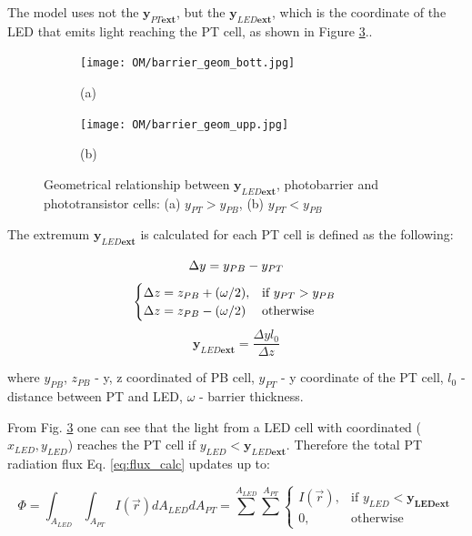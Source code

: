 The model uses not the $\boldsymbol{y_{\textit{PT}ext}}$, but the $\boldsymbol{y_{\textit{LED}ext}}$, 
which is the coordinate of the LED that emits light reaching the PT cell, as shown in Figure \ref{fig:extremum_ys_cell}..
\begin{figure}[H]
  \centering
  \begin{subfigure}[b]{0.3\textwidth}
    \texttt{[image: OM/barrier\_geom\_bott.jpg]}
    \centering
    \label{fig:extremum_ys_cell_bottom}
    \caption*{(a)}
  \end{subfigure}
  \begin{subfigure}[b]{0.35\textwidth}
    \texttt{[image: OM/barrier\_geom\_upp.jpg]}
    \label{fig:extremum_ys_cell_upp}
    \caption*{(b)}
  \end{subfigure}
  \caption{Geometrical relationship between $\boldsymbol{y_{\textit{LED}ext}}$, photobarrier and phototransistor cells: (a) $y_{PT} > y_{PB}$, (b)  $y_{PT} < y_{PB}$ }
  \label{fig:extremum_ys_cell}

\end{figure}

The extremum $\boldsymbol{y_{\textit{LED}ext}}$ is calculated for each PT cell is defined as the following:

$$
  \Delta y = y_{PB} - y_{PT}\\
$$
$$
  \begin{cases}
    \Delta z = z_{PB} + (\omega / 2), &  \text{if }y_{PT} > y_{PB}\\
    \Delta z = z_{PB} - (\omega / 2)  & \text{otherwise}
  \end{cases}\\
$$
$$
  \boldsymbol{y_{\textit{LED}ext}} = \frac{\Delta y  l_0}{\Delta z}
$$

where $y_{PB}$, $z_{PB}$ - y, z coordinated of PB cell, 
$y_{PT}$ - y coordinate of the PT cell,
$l_0$ - distance between PT and LED,
$\omega$ - barrier thickness.

From Fig. \ref{fig:extremum_ys_cell} one can see that the light from a LED cell with coordinated ($ x_{LED}, y_{LED}$) reaches the PT cell if $y_{LED} < \boldsymbol{y_{\textit{LED}ext}}$.
Therefore the total PT radiation flux Eq. \ref{eq:flux_calc} updates up to:

\begin{equation}
  \Phi = \int_{A_{LED}} \int_{A_{PT}} I(\vec{r})d A_{LED} d A_{PT} = \sum_{}^{A_{LED}} \sum_{}^{A_{PT}} \begin{cases}
    I(\vec{r}), & \text{if }y_{LED} < \boldsymbol{y_{\text{LED}ext}}\\
    0, & \text{otherwise}
  \end{cases}
  \label{eq:flux}
\end{equation}

